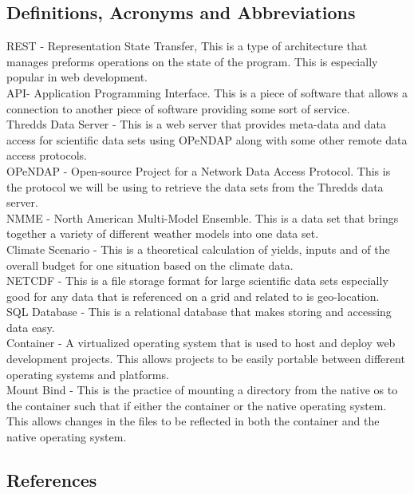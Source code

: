\documentclass[onecolumn, draftclsnofoot,10pt, compsoc]{article}
\begin{document}
		\subsection{Definitions, Acronyms and Abbreviations}
			REST - Representation State Transfer, This is a type of architecture that manages preforms operations on the state of the program. This is especially popular in web development.\\
			API- Application Programming Interface. This is a piece of software that allows a connection to another piece of software providing some sort of service.\\
			Thredds Data Server - This is a web server that provides meta-data and data access for scientific data sets using OPeNDAP along with some other remote data access protocols.\\
			OPeNDAP - Open-source Project for a Network Data Access Protocol. This is the protocol we will be using to retrieve the data sets from the Thredds data server.\\
			NMME - North American Multi-Model Ensemble. This is a data set that brings together a variety of different weather models into one data set.\\
			Climate Scenario - This is a theoretical calculation of yields, inputs and of the overall budget for one situation based on the climate data.\\
			NETCDF - This is a file storage format for large scientific data sets especially good for any data that is referenced on a grid and related to is geo-location.\\
			SQL Database - This is a relational database that makes storing and accessing data easy.\\
			Container - A virtualized operating system that is used to host and deploy web development projects. This allows projects to be easily portable between different operating systems and platforms.\\
			Mount Bind - This is the practice of mounting a directory from the native os to the container such that if either the container or the native operating system. This allows changes in the files to be reflected in both the container and the native operating system.\\
			

			\renewcommand\refname{\vskip -1cm}
		\subsection{References}
\end{document}
